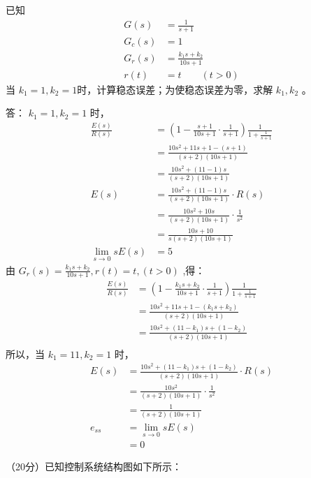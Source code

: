 已知
\begin{align*}
G(s) &=\frac{1}{s+1} \\
G_c(s) &=1\\
G_r(s) &=\frac{k_1 s+k_2}{10s+1}\\
r(t)&=t\qquad(t>0)
\end{align*} 
当 $k_1=1,k_2=1$时，计算稳态误差；为使稳态误差为零，求解 $k_1,k_2$ 。

\onlyanswer
{
	答：
	$k_1=1,k_2=1$ 时，
	\begin{align*}
	\frac{E(s)}{R(s)} &= (1-\frac{s+1}{10s+1}\cdot\frac{1}{s+1})\frac{1}{1+\frac{1}{s+1}} \\
	&=\frac{10s^2+11s+1-(s+1)}{(s+2)(10s+1)} \\
	&=\frac{10s^2+(11-1)s}{(s+2)(10s+1)} \\
	E(s) &=\frac{10s^2+(11-1)s}{(s+2)(10s+1)} \cdot R(s) \\
	&=\frac{10s^2+10s}{(s+2)(10s+1)} \cdot \frac{1}{s^2} \\
	&=\frac{10s+10}{s(s+2)(10s+1)}\\
	\lim_{s\rightarrow 0} sE(s) &=5
	\end{align*}
	由 $G_r(s)=\frac{k_1 s+k_2}{10s+1}, r(t)=t, (t>0)$ ,得：
	\begin{align*}
	\frac{E(s)}{R(s)} &= (1-\frac{k_1s+k_2}{10s+1}\cdot\frac{1}{s+1})\frac{1}{1+\frac{1}{s+1}} \\
	&=\frac{10s^2+11s+1-(k_1s+k_2)}{(s+2)(10s+1)} \\
	&=\frac{10s^2+(11-k_1)s+(1-k_2)}{(s+2)(10s+1)} \\
	\end{align*}
	所以，当 $k_1=11,k_2=1$ 时，
	\begin{align*}
	E(s) &=\frac{10s^2+(11-k_1)s+(1-k_2)}{(s+2)(10s+1)}\cdot R(s) \\
	&=\frac{10s^2}{(s+2)(10s+1)}\cdot \frac{1}{s^2} \\
	&=\frac{1}{(s+2)(10s+1)} \\
	e_{ss} &= \lim_{s\rightarrow 0} sE(s) \\
	&= 0
	\end{align*}
	
}


\onlytest{\newpage}

\question（20分）已知控制系统结构图如下所示：

